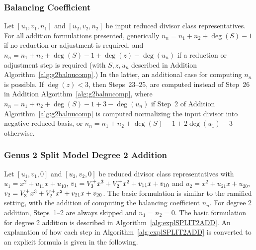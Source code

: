 \subsubsection{Balancing Coefficient}\label{sec:expladd} Let $[u_1,v_1,n_1]$ and
$[u_2,v_2,n_2]$ be input reduced divisor class representatives. For all addition
formulations presented, generically $n_n = n_1 + n_2 + \deg(S) - 1$ if no
reduction or adjustment is required, and $n_n = n_1 + n_2 + \deg(S) - 1 +
\deg(z) - \deg(u_n)$ if a reduction or adjustment step is required (with
$S,z,u_n$ described in Addition Algorithm~\ref{alg:g2balnucomp}.) In the latter,
an additional case for computing $n_n$ is possible. If $\deg(z) < 3$, then
Steps~23--25, are computed instead of Step~26 in Addition
Algorithm~\ref{alg:g2balnucomp}, where $n_n = n_1 + n_2 + \deg(S) - 1 + 3 -
\deg(u_n)$ if Step~2 of Addition Algorithm~\ref{alg:g2balnucomp} is computed
normalizing the input divisor into negative reduced basis, or $n_n = n_1 + n_2 +
\deg(S) - 1 + 2\deg(u_1) - 3$ otherwise.

\subsubsection{Genus 2 Split Model Degree 2 Addition}
Let $[u_1,v_1,0]$ and $[u_2,v_2,0]$ be reduced divisor class representatives
with $u_1 = x^2 + u_{11}x + u_{10}$, $v_1 = V^{+}_3x^3 + V^{+}_2x^2 + v_{11}x +
v_{10}$ and $u_2 = x^2 + u_{21}x + u_{20}$, $v_2 = V^{+}_3x^3 + V^{+}_2x^2 + v_{21}x
+ v_{20}$. The basic formulation is similar to the ramified setting, with the 
addition of computing the balancing coefficient $n_n$. For degree 2 addition,
Steps~1--2 are always skipped and $n_1 = n_2 = 0$. The basic formulation for
degree 2 addition is described in Algorithm~\ref{alg:explSPLIT2ADD}. An
explanation of how each step in Algorithm~\ref{alg:explSPLIT2ADD} is converted
to an explicit formula is given in the following.

